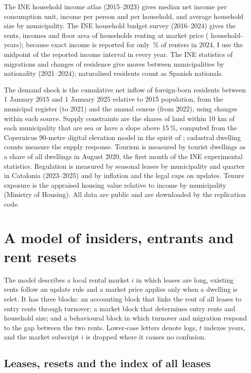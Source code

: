 \documentclass[11pt,a4paper]{article}
\begin{document}
The INE household income atlas (2015--2023) gives median net income per consumption unit, income per person and per household, and average household size by municipality. The INE household budget survey (2016--2024) gives the rents, incomes and floor area of households renting at market price (\epfN{} household-years); because exact income is reported for only \epfExactNine\,\% of renters in 2024, I use the midpoint of the reported income interval in every year. The INE statistics of migrations and changes of residence give moves between municipalities by nationality (2021--2024); naturalised residents count as Spanish nationals.

The demand shock is the cumulative net inflow of foreign-born residents between 1 January 2015 and 1 January 2025 relative to 2015 population, from the municipal register (to 2021) and the annual census (from 2022), using changes within each source. Supply constraints are the shares of land within 10 km of each municipality that are sea or have a slope above 15\,\%, computed from the Copernicus 90-metre digital elevation model in the spirit of \citet{saiz2010}; cadastral dwelling counts measure the supply response. Tourism is measured by tourist dwellings as a share of all dwellings in August 2020, the first month of the INE experimental statistics. Regulation is measured by seasonal leases by municipality and quarter in Catalonia (2023--2025) and by inflation and the legal caps on updates. Tenure exposure is the appraised housing value relative to income by municipality (Ministry of Housing). All data are public and are downloaded by the replication code.

\section{A model of insiders, entrants and rent resets}\label{sec:theory}

The model describes a local rental market $i$ in which leases are long, existing rents follow an update rule and a market price applies only when a dwelling is relet. It has three blocks: an accounting block that links the rent of all leases to entry rents through turnover; a market block that determines entry rents and household size; and a behavioural block in which turnover and migration respond to the gap between the two rents. Lower-case letters denote logs, $t$ indexes years, and the market subscript $i$ is dropped where it causes no confusion.

\subsection{Leases, resets and the index of all leases}
\end{document}
